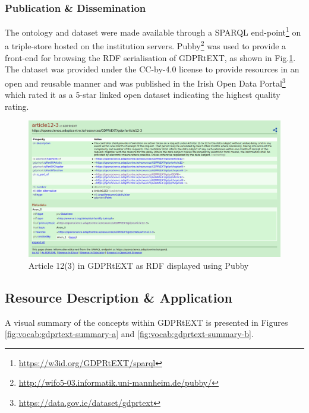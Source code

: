 \subsubsection{Publication \& Dissemination}
The ontology and dataset were made available through a SPARQL end-point\footnote{\url{https://w3id.org/GDPRtEXT/sparql}} on a triple-store hosted on the institution servers. Pubby\footnote{\url{http://wifo5-03.informatik.uni-mannheim.de/pubby/}} was used to provide a front-end for browsing the RDF serialisation of GDPRtEXT, as shown in Fig.\ref{fig:vocab:gdprtext-pubby}. The dataset was provided under the CC-by-4.0 license to provide resources in an open and reusable manner and was published in the Irish Open Data Portal\footnote{\url{https://data.gov.ie/dataset/gdprtext}} which rated it as a 5-star linked open dataset indicating the highest quality rating. \begin{figure}[htbp]
    \centering
    \includegraphics[width=\linewidth]{img/gdprtext-pubby}
    \caption{Article 12(3) in GDPRtEXT as RDF displayed using Pubby \cite{}}
    \label{fig:vocab:gdprtext-pubby}
\end{figure}

\subsection{Resource Description \& Application}
A visual summary of the concepts within GDPRtEXT is presented in Figures \ref{fig:vocab:gdprtext-summary-a} and \ref{fig:vocab:gdprtext-summary-b}.

